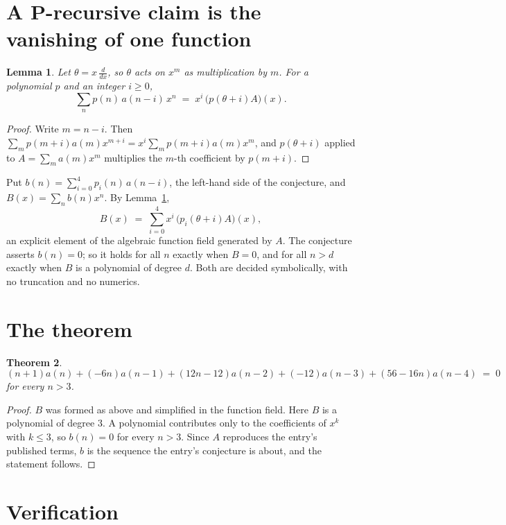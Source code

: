 \documentclass[11pt,a4paper]{article}
\theoremstyle{plain}
\newtheorem{theorem}{Theorem}
\newtheorem{lemma}[theorem]{Lemma}
\theoremstyle{definition}
\begin{document}
\section{A P-recursive claim is the vanishing of one function}

\begin{lemma}\label{lem:theta}
Let $\theta=x\,\frac{d}{dx}$, so $\theta$ acts on $x^m$ as multiplication by $m$. For a
polynomial $p$ and an integer $i\ge0$,
\[
\sum_{n} p(n)\,a(n-i)\,x^{n}\;=\;x^{i}\,\bigl(p(\theta+i)A\bigr)(x).
\]
\end{lemma}

\begin{proof}
Write $m=n-i$. Then $\sum_m p(m+i)a(m)x^{m+i}=x^i\sum_m p(m+i)a(m)x^m$, and $p(\theta+i)$
applied to $A=\sum_m a(m)x^m$ multiplies the $m$-th coefficient by $p(m+i)$.
\end{proof}

Put $b(n)=\sum_{i=0}^{4}p_i(n)\,a(n-i)$, the left-hand side of the conjecture, and
$B(x)=\sum_n b(n)x^n$. By Lemma~\ref{lem:theta},
\[
B(x)\;=\;\sum_{i=0}^{4}x^{i}\,\bigl(p_i(\theta+i)A\bigr)(x),
\]
an explicit element of the algebraic function field generated by $A$. The conjecture asserts
$b(n)=0$; so it holds for all $n$ exactly when $B=0$, and for all $n>d$ exactly when $B$ is a
polynomial of degree $d$. Both are decided symbolically, with no truncation and no numerics.

\section{The theorem}

\begin{theorem}
\[
\left(n + 1\right)a(n) + \left(- 6 n\right)a(n-1) + \left(12 n - 12\right)a(n-2) + \left(-12\right)a(n-3) + \left(56 - 16 n\right)a(n-4)\;=\;0
\]
for every $n>3$.
\end{theorem}

\begin{proof}
$B$ was formed as above and simplified in the function field. Here $B$ is a polynomial of degree $3$. A polynomial contributes only to the coefficients of $x^k$ with $k\le3$, so $b(n)=0$ for every $n>3$. Since $A$ reproduces the
entry's published terms, $b$ is the sequence the entry's conjecture is about, and the statement
follows.
\end{proof}

\section{Verification}
\end{document}
